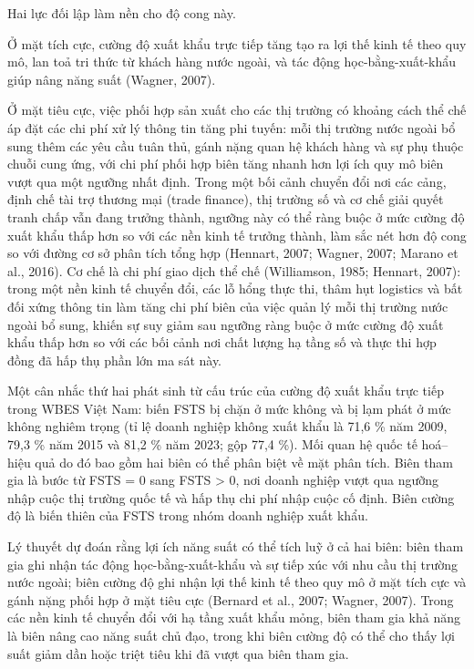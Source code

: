 \documentclass[12pt,a4paper]{article}
\begin{document}
Hai lực đối lập làm nền cho độ cong này.

Ở mặt tích cực, cường độ xuất khẩu trực tiếp tăng tạo ra lợi thế kinh tế
theo quy mô, lan toả tri thức từ khách hàng nước ngoài, và tác động
học-bằng-xuất-khẩu giúp nâng năng suất (Wagner, 2007).

Ở mặt tiêu cực, việc phối hợp sản xuất cho các thị trường có khoảng cách
thể chế áp đặt các chi phí xử lý thông tin tăng phi tuyến: mỗi thị
trường nước ngoài bổ sung thêm các yêu cầu tuân thủ, gánh nặng quan hệ
khách hàng và sự phụ thuộc chuỗi cung ứng, với chi phí phối hợp biên
tăng nhanh hơn lợi ích quy mô biên vượt qua một ngưỡng nhất định. Trong
một bối cảnh chuyển đổi nơi các cảng, định chế tài trợ thương mại (trade
finance), thị trường số và cơ chế giải quyết tranh chấp vẫn đang trưởng
thành, ngưỡng này có thể ràng buộc ở mức cường độ xuất khẩu thấp hơn so
với các nền kinh tế trưởng thành, làm sắc nét hơn độ cong so với đường
cơ sở phân tích tổng hợp (Hennart, 2007; Wagner, 2007; Marano et al.,
2016). Cơ chế là chi phí giao dịch thể chế (Williamson, 1985; Hennart,
2007): trong một nền kinh tế chuyển đổi, các lỗ hổng thực thi, thâm hụt
logistics và bất đối xứng thông tin làm tăng chi phí biên của việc quản
lý mỗi thị trường nước ngoài bổ sung, khiến sự suy giảm sau ngưỡng ràng
buộc ở mức cường độ xuất khẩu thấp hơn so với các bối cảnh nơi chất
lượng hạ tầng số và thực thi hợp đồng đã hấp thụ phần lớn ma sát này.

Một cân nhắc thứ hai phát sinh từ cấu trúc của cường độ xuất khẩu trực
tiếp trong WBES Việt Nam: biến FSTS bị chặn ở mức không và bị lạm phát ở
mức không nghiêm trọng (tỉ lệ doanh nghiệp không xuất khẩu là 71,6 \%
năm 2009, 79,3 \% năm 2015 và 81,2 \% năm 2023; gộp 77,4 \%). Mối quan
hệ quốc tế hoá--hiệu quả do đó bao gồm hai biên có thể phân biệt về mặt
phân tích. Biên tham gia là bước từ FSTS = 0 sang FSTS \textgreater{} 0,
nơi doanh nghiệp vượt qua ngưỡng nhập cuộc thị trường quốc tế và hấp thụ
chi phí nhập cuộc cố định. Biên cường độ là biến thiên của FSTS trong
nhóm doanh nghiệp xuất khẩu.

Lý thuyết dự đoán rằng lợi ích năng suất có thể tích luỹ ở cả hai biên:
biên tham gia ghi nhận tác động học-bằng-xuất-khẩu và sự tiếp xúc với
nhu cầu thị trường nước ngoài; biên cường độ ghi nhận lợi thế kinh tế
theo quy mô ở mặt tích cực và gánh nặng phối hợp ở mặt tiêu cực (Bernard
et al., 2007; Wagner, 2007). Trong các nền kinh tế chuyển đổi với hạ
tầng xuất khẩu mỏng, biên tham gia khả năng là biên nâng cao năng suất
chủ đạo, trong khi biên cường độ có thể cho thấy lợi suất giảm dần hoặc
triệt tiêu khi đã vượt qua biên tham gia.
\end{document}
